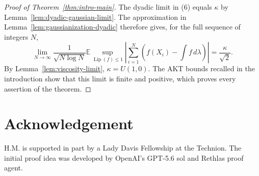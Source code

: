 \documentclass{aomart}
\theoremstyle{definition}
\newcommand{\1}{\mathbf 1}
\newcommand{\Lip}{\operatorname{Lip}}
\begin{document}
\begin{samepage}
\begin{proof}[Proof of Theorem~\ref{thm:intro-main}]
The dyadic limit in (6) equals $\kappa$ by
Lemma~\ref{lem:dyadic-gaussian-limit}.  The approximation in
Lemma~\ref{lem:gaussianization-dyadic} therefore gives, for the full
sequence of integers $N$,
\begin{equation*}
\lim_ {N\to\infty}\frac1{\sqrt{N\log N}}
\mathbb E\sup_ {\Lip(f)\leq1}
\left|\sum_ {i=1}^N\left(f(X_ i)-\int f\,d\lambda\right)\right|
=\frac\kappa{\sqrt2}.
\end{equation*}
By Lemma~\ref{lem:viscosity-limit}, $\kappa=U(1,0)$.  The AKT bounds
recalled in the introduction show that this limit is finite and positive,
which proves every assertion of the theorem.

\end{proof}

\end{samepage}

\section*{Acknowledgement}

H.M. is supported in part by a Lady Davis Fellowship at the Technion.
The initial proof idea was developed by OpenAI's GPT-5.6 sol and
Rethlas proof agent.

\begingroup
\raggedright


\endgroup
\end{document}
